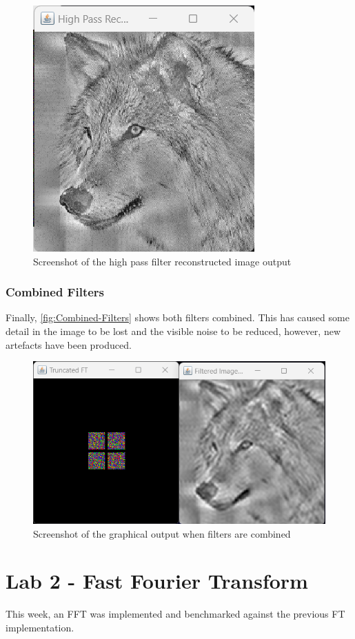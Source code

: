       \begin{figure}[H]
        \centering
        \includegraphics[width=0.49\columnwidth]{Figures/Week 1/W1-High-Pass-Reconstructed.png}
        \caption{Screenshot of the high pass filter reconstructed image output}
        \label{fig:High-Pass-Filter-Image}
      \end{figure}

      \subsubsection{Combined Filters}
      Finally, \autoref{fig:Combined-Filters} shows both filters combined. This has caused some detail in the image to be lost and the visible noise to be reduced, however, new artefacts have been produced.
        \begin{figure}[H] 
            \centering
            \includegraphics[width=0.8\columnwidth]{Figures/Week 1/W1-Both-Filters.png}
            \caption{Screenshot of the graphical output when filters are combined}
            \label{fig:Combined-Filters}
        \end{figure}



\newpage
\section{Lab 2 - Fast Fourier Transform}
This week, an FFT was implemented and benchmarked against the previous FT implementation. 

